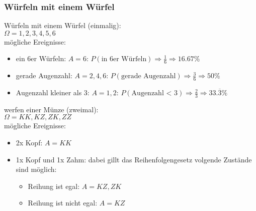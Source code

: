 \subsubsection{Würfeln mit einem Würfel}

\hfill \break
Würfeln mit einem Würfel (einmalig):\\
$\Omega = {1,2,3,4,5,6}$\\
mögliche Ereignisse:\\
\begin{itemize}
    \item ein 6er Würfeln: $A={6}$: $P(\textrm{in 6er Würfeln}) \Rightarrow \frac{1}{6} \Rightarrow 16.67\%$
    \item gerade Augenzahl: $A={2,4,6}$: $P(\textrm{gerade Augenzahl}) \Rightarrow \frac{3}{6} \Rightarrow 50\%$
    \item Augenzahl kleiner als 3: $A={1,2}$: $P(\textrm{Augenzahl < 3}) \Rightarrow \frac{2}{3} \Rightarrow 33.\overline{3}\%$
\end{itemize}

\hfill \break
werfen einer Münze (zweimal):\\
$\Omega = {KK,KZ,ZK,ZZ}$\\
mögliche Ereignisse:\\
\begin{itemize}
    \item 2x Kopf: $A={KK}$
    \item 1x Kopf und 1x Zahm: dabei gillt das Reihenfolgengesetz volgende Zustände sind möglich: \begin{itemize}
              \item Reihung ist egal: $A={KZ,ZK}$
              \item Reihung ist nicht egal: $A={KZ}$
          \end{itemize}
\end{itemize}
